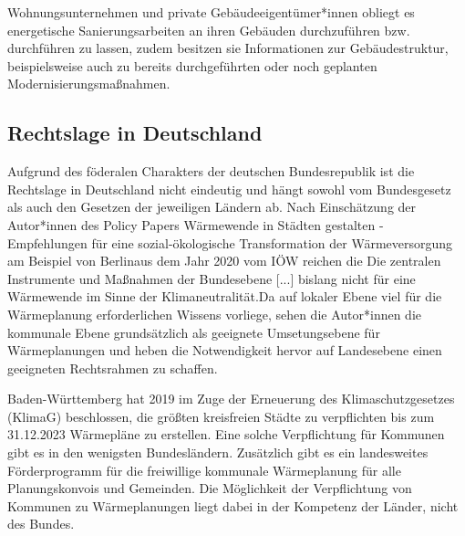 			Wohnungsunternehmen und private Gebäudeeigentümer*innen obliegt es energetische Sanierungsarbeiten an ihren Gebäuden durchzuführen bzw. durchführen zu lassen, zudem besitzen sie Informationen zur Gebäudestruktur, beispielsweise auch zu bereits durchgeführten oder noch geplanten Modernisierungsmaßnahmen. 
				
					
			
			
		
		\subsection{Rechtslage in Deutschland}
		\label{sec:Grundlagen:Rechtslage_in_Deutschland}
			Aufgrund des föderalen Charakters der deutschen Bundesrepublik ist die Rechtslage in Deutschland nicht eindeutig und hängt sowohl vom Bundesgesetz als auch den Gesetzen der jeweiligen Ländern ab. Nach Einschätzung der Autor*innen des Policy Papers \frqq Wärmewende in Städten gestalten - Empfehlungen für eine sozial-ökologische Transformation der Wärmeversorgung am Beispiel von Berlin\flqq aus dem Jahr 2020 vom IÖW reichen die \frqq Die zentralen Instrumente und Maßnahmen der Bundesebene [...] bislang nicht für eine Wärmewende im Sinne der Klimaneutralität.\flqq Da auf lokaler Ebene viel für die Wärmeplanung erforderlichen Wissens vorliege, sehen die Autor*innen die kommunale Ebene grundsätzlich als geeignete Umsetungsebene für Wärmeplanungen und heben die Notwendigkeit hervor auf Landesebene einen geeigneten Rechtsrahmen zu schaffen. \cite{dunkelberg_2020_waermewende_in_staedten_gestalten}
			
			Baden-Württemberg hat 2019 im Zuge der Erneuerung des Klimaschutzgesetzes (KlimaG) beschlossen, die größten kreisfreien Städte zu verpflichten bis zum 31.12.2023 Wärmepläne zu erstellen. Eine solche Verpflichtung für Kommunen gibt es in den wenigsten Bundesländern. Zusätzlich gibt es ein landesweites Förderprogramm für die freiwillige kommunale Wärmeplanung für alle Planungskonvois und Gemeinden. Die Möglichkeit der Verpflichtung von Kommunen zu Wärmeplanungen liegt dabei in der Kompetenz der Länder, nicht des Bundes. 
			\cite{uba_2022_kurzgutachten_waermeplanung} \cite{dunkelberg_2020_waermewende_in_staedten_gestalten}
	
